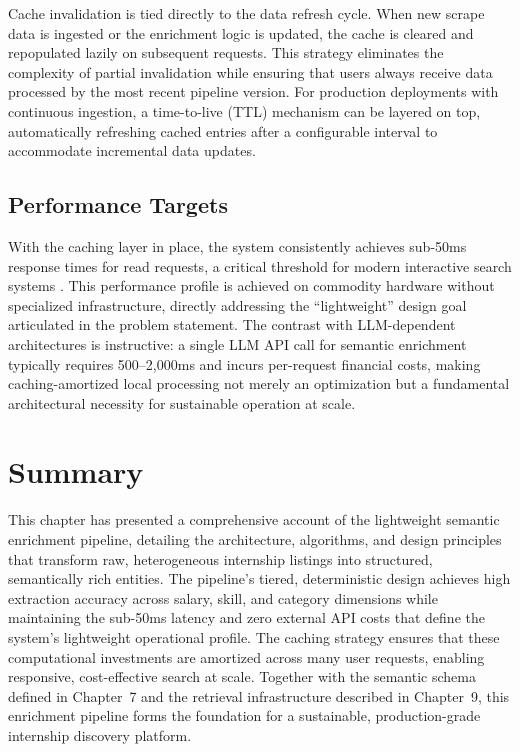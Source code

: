 Cache invalidation is tied directly to the data refresh cycle. When new scrape data is ingested or the enrichment logic is updated, the cache is cleared and repopulated lazily on subsequent requests. This strategy eliminates the complexity of partial invalidation while ensuring that users always receive data processed by the most recent pipeline version. For production deployments with continuous ingestion, a time-to-live (TTL) mechanism can be layered on top, automatically refreshing cached entries after a configurable interval to accommodate incremental data updates.

\subsection{Performance Targets}

With the caching layer in place, the system consistently achieves sub-50ms response times for read requests, a critical threshold for modern interactive search systems \cite{buttcher2016information}. This performance profile is achieved on commodity hardware without specialized infrastructure, directly addressing the ``lightweight'' design goal articulated in the problem statement. The contrast with LLM-dependent architectures is instructive: a single LLM API call for semantic enrichment typically requires 500--2,000ms and incurs per-request financial costs, making caching-amortized local processing not merely an optimization but a fundamental architectural necessity for sustainable operation at scale.

\section{Summary}

This chapter has presented a comprehensive account of the lightweight semantic enrichment pipeline, detailing the architecture, algorithms, and design principles that transform raw, heterogeneous internship listings into structured, semantically rich entities. The pipeline's tiered, deterministic design achieves high extraction accuracy across salary, skill, and category dimensions while maintaining the sub-50ms latency and zero external API costs that define the system's lightweight operational profile. The caching strategy ensures that these computational investments are amortized across many user requests, enabling responsive, cost-effective search at scale. Together with the semantic schema defined in Chapter~7 and the retrieval infrastructure described in Chapter~9, this enrichment pipeline forms the foundation for a sustainable, production-grade internship discovery platform.